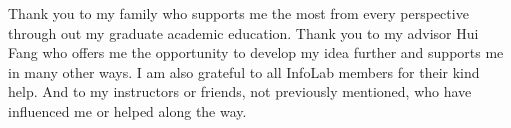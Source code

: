 Thank you to my family who supports me the most from every perspective through out my graduate academic education. 
Thank you to my advisor Hui Fang who offers me the opportunity to develop my idea further and supports me in many other ways. 
I am also grateful to all InfoLab members for their kind help. And to my instructors or friends, not previously mentioned, who have influenced me or helped along the way.
